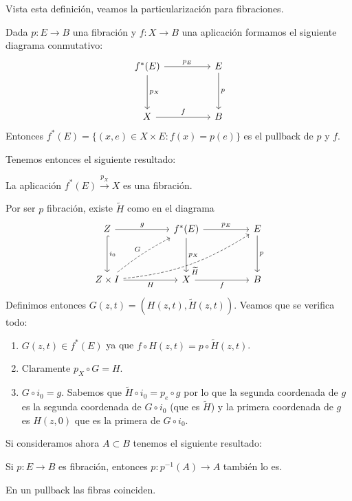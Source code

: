 Vista esta definición, veamos la particularización para fibraciones. \par Dada $p : E \longrightarrow B$ una fibración y $f : X \longrightarrow B$ una aplicación formamos el siguiente diagrama conmutativo:
\[
\begin{tikzcd}
f^*(E) \arrow{rr}{p_E} \arrow{dd}{p_X} & & E \arrow{dd}{p} \\
\\
X \arrow{rr}{f} & & B
\end{tikzcd}
\]
Entonces $f^*(E) = \{ (x,e) \in X \times E : f(x) = p(e) \}$ es el pullback de $p$ y $f$. \par
Tenemos entonces el siguiente resultado:
\begin{teor}
La aplicación $f^*(E) \stackrel{p_X}{\longrightarrow} X$ es una fibración.
\end{teor}
\begin{demo}
Por ser $p$ fibración, existe $\widetilde{H}$ como en el diagrama
\[
\begin{tikzcd}
Z \arrow{rr}{g} \arrow[hook]{dd}{i_0} && f^*(E) \arrow{rr}{p_E} \arrow{dd}{p_X} && E \arrow{dd}{p} \\
\\
Z\times I \arrow[swap]{rr}{H} \arrow[dashed, bend left=5]{uurr}{G} \arrow[dashed, bend right=13, swap]{rrrruu}{\widetilde{H}} && X \arrow[swap]{rr}{f} && B
\end{tikzcd}
\]
Definimos entonces $G(z,t) = \left(H(z,t), \widetilde{H}(z,t)\right)$. Veamos que se verifica todo:
\begin{enumerate}
\item $G(z,t) \in f^*(E)$ ya que $f \circ H(z,t) = p \circ \widetilde{H}(z,t)$.
\item Claramente $p_X \circ G = H$.
\item $G \circ i_0 = g$. Sabemos que $\widetilde{H} \circ i_0 = p_e \circ g$ por lo que la segunda coordenada de $g$ es la segunda coordenada de $G \circ i_0$ (que es $\widetilde{H}$) y la primera coordenada de $g$ es $H(z,0)$ que es la primera de $G \circ i_0$. 
\end{enumerate}
\end{demo}
Si consideramos ahora $A \subset B$ tenemos el siguiente resultado:
\begin{coro}
Si $p : E \longrightarrow B$ es fibración, entonces $p : p^{-1}(A) \longrightarrow A$ también lo es.
\end{coro}
\begin{prop}
En un pullback las fibras coinciden.
\end{prop}
